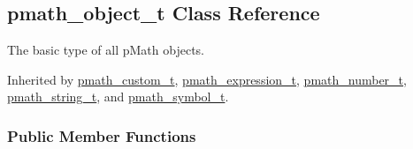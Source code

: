 \hypertarget{classpmath__object__t}{
\subsection{pmath\_\-object\_\-t Class Reference}
\label{classpmath__object__t}
}
The basic type of all pMath objects.  


Inherited by \hyperlink{classpmath__custom__t}{pmath\_\-custom\_\-t}, \hyperlink{classpmath__expression__t}{pmath\_\-expression\_\-t}, \hyperlink{classpmath__number__t}{pmath\_\-number\_\-t}, \hyperlink{classpmath__string__t}{pmath\_\-string\_\-t}, and \hyperlink{classpmath__symbol__t}{pmath\_\-symbol\_\-t}.

\subsubsection*{Public Member Functions}
